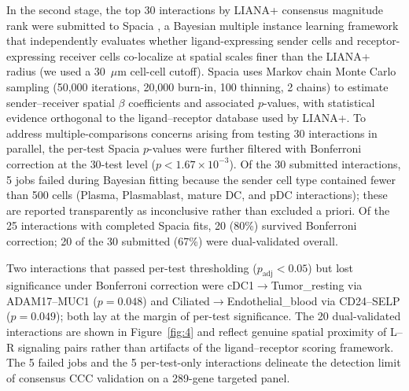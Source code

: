 \documentclass[12pt,a4paper]{article}
\begin{document}
In the second stage, the top 30 interactions by LIANA+ consensus magnitude rank were submitted to Spacia \citep{zhu2024spacia}, a Bayesian multiple instance learning framework that independently evaluates whether ligand-expressing sender cells and receptor-expressing receiver cells co-localize at spatial scales finer than the LIANA+ radius (we used a 30~$\mu$m cell-cell cutoff). Spacia uses Markov chain Monte Carlo sampling (50,000 iterations, 20,000 burn-in, 100 thinning, 2 chains) to estimate sender--receiver spatial $\beta$ coefficients and associated $p$-values, with statistical evidence orthogonal to the ligand--receptor database used by LIANA+. To address multiple-comparisons concerns arising from testing 30 interactions in parallel, the per-test Spacia $p$-values were further filtered with Bonferroni correction at the $30$-test level ($p < 1.67 \times 10^{-3}$). Of the 30 submitted interactions, 5 jobs failed during Bayesian fitting because the sender cell type contained fewer than 500 cells (Plasma, Plasmablast, mature DC, and pDC interactions); these are reported transparently as inconclusive rather than excluded a priori. Of the 25 interactions with completed Spacia fits, 20 (80\%) survived Bonferroni correction; 20 of the 30 submitted (67\%) were dual-validated overall.

Two interactions that passed per-test thresholding ($p_{\text{adj}} < 0.05$) but lost significance under Bonferroni correction were cDC1$\to$Tumor\_resting via ADAM17--MUC1 ($p = 0.048$) and Ciliated$\to$Endothelial\_blood via CD24--SELP ($p = 0.049$); both lay at the margin of per-test significance. The 20 dual-validated interactions are shown in Figure~\ref{fig:4} and reflect genuine spatial proximity of L--R signaling pairs rather than artifacts of the ligand--receptor scoring framework. The 5 failed jobs and the 5 per-test-only interactions delineate the detection limit of consensus CCC validation on a 289-gene targeted panel.
\end{document}
